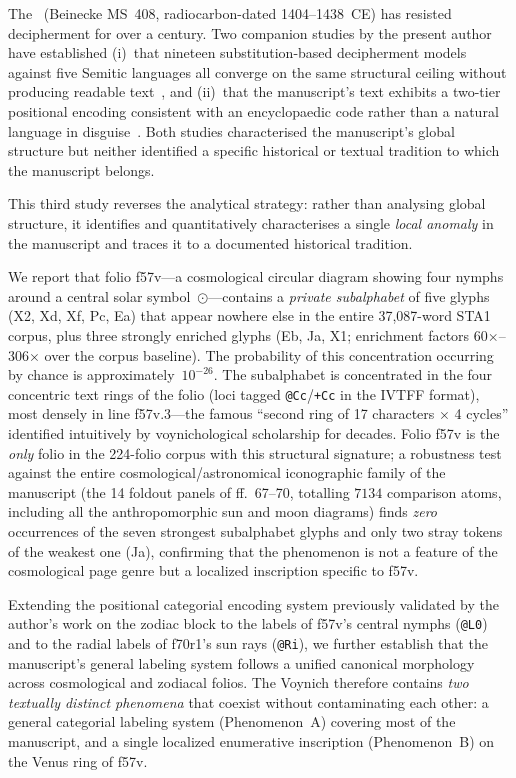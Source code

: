 
The \vms\ (Beinecke MS~408, radiocarbon-dated 1404--1438~CE) has resisted decipherment for over a century. Two companion studies by the present author have established (i)~that nineteen substitution-based decipherment models against five Semitic languages all converge on the same structural ceiling without producing readable text~\citep{jimenez2026negative}, and (ii)~that the manuscript's text exhibits a two-tier positional encoding consistent with an encyclopaedic code rather than a natural language in disguise~\citep{jimenez2026twotier}. Both studies characterised the manuscript's global structure but neither identified a specific historical or textual tradition to which the manuscript belongs.

This third study reverses the analytical strategy: rather than analysing global structure, it identifies and quantitatively characterises a single \emph{local anomaly} in the manuscript and traces it to a documented historical tradition.

We report that folio f57v---a cosmological circular diagram showing four nymphs around a central solar symbol~$\odot$---contains a \emph{private subalphabet} of five glyphs (X2, Xd, Xf, Pc, Ea) that appear nowhere else in the entire 37,087-word STA1 corpus, plus three strongly enriched glyphs (Eb, Ja, X1; enrichment factors 60$\times$--306$\times$ over the corpus baseline). The probability of this concentration occurring by chance is approximately~$10^{-26}$. The subalphabet is concentrated in the four concentric text rings of the folio (loci tagged \texttt{@Cc}/\texttt{+Cc} in the IVTFF format), most densely in line f57v.3---the famous ``second ring of 17 characters $\times$ 4 cycles'' identified intuitively by voynichological scholarship for decades. Folio f57v is the \emph{only} folio in the 224-folio corpus with this structural signature; a robustness test against the entire cosmological/astronomical iconographic family of the manuscript (the 14 foldout panels of ff.~67--70, totalling $7134$ comparison atoms, including all the anthropomorphic sun and moon diagrams) finds \emph{zero} occurrences of the seven strongest subalphabet glyphs and only two stray tokens of the weakest one (Ja), confirming that the phenomenon is not a feature of the cosmological page genre but a localized inscription specific to f57v.

Extending the positional categorial encoding system previously validated by the author's work on the zodiac block to the labels of f57v's central nymphs (\texttt{@L0}) and to the radial labels of f70r1's sun rays (\texttt{@Ri}), we further establish that the manuscript's general labeling system follows a unified canonical morphology across cosmological and zodiacal folios. The Voynich therefore contains \emph{two textually distinct phenomena} that coexist without contaminating each other: a general categorial labeling system (Phenomenon~A) covering most of the manuscript, and a single localized enumerative inscription (Phenomenon~B) on the Venus ring of f57v.

